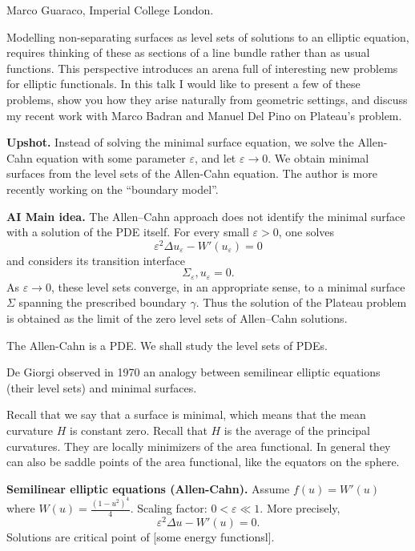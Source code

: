 \medskip\noindent
Marco Guaraco, Imperial College London.



\medskip{} Modelling
non-separating surfaces as level sets of
solutions to an elliptic equation, requires
thinking of these as sections of a line
bundle rather than as usual functions. This
perspective introduces an arena full of
interesting new problems for elliptic
functionals. In this talk I would like to
present a few of these problems, show you how
they arise naturally from geometric settings,
and discuss my recent work with Marco Badran
and Manuel Del Pino on Plateau’s problem.

\medskip\noindent
{\bf Upshot.}
Instead of solving the minimal surface
equation, we solve the Allen-Cahn
equation with some parameter $\varepsilon$,
and let $\varepsilon \to 0$.
We obtain minimal surfaces
from the level sets of the Allen-Cahn
equation.
The author is more recently working
on the ``boundary model''.


\medskip\noindent
{\bf AI Main idea.}
The Allen--Cahn approach does not
identify the minimal surface with a
solution of the PDE itself. For every
small $\varepsilon>0$, one solves
$$
\varepsilon^2\Delta u_\varepsilon
-W'(u_\varepsilon)=0
$$
and considers its transition interface
$$
\Sigma_\varepsilon,
{u_\varepsilon=0}.
$$
As $\varepsilon\to0$, these level sets
converge, in an appropriate sense, to a
minimal surface $\Sigma$ spanning the
prescribed boundary $\gamma$. Thus the
solution of the Plateau problem is
obtained as the limit of the zero level
sets of Allen--Cahn solutions.


\medskip\noindent
The Allen-Cahn is a PDE. We
shall study the level sets of PDEs.

\medskip\noindent
De Giorgi observed in 1970 an analogy
between semilinear elliptic equations 
(their level sets) and
minimal surfaces.

Recall that we say that a surface is minimal,
which means that the mean curvature $H$
is constant zero. Recall that $H$
is the average of the principal curvatures.
They are locally minimizers of the
area functional. In general they
can also be saddle points of the area
functional, like the equators on the sphere.

\medskip\noindent
{\bf Semilinear elliptic equations
(Allen-Cahn).}
Assume  $f(u)=W'(u)$ where 
$W(u)=\frac{(1-u^2)^4}{4}$.
Scaling factor: $0<\varepsilon \ll 1$.
More precisely,
$$
\varepsilon^2\Delta u - W'(u)=0.
$$
Solutions are critical point of [some
energy functionsl].

